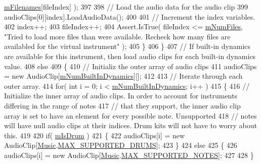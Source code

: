 \begin{DoxyCode}
      \hyperlink{group___v_i_base_pro_var_gab2add474ca506357688b5dd08cac4cb5}{mFilenames}[fileIndex] );
397 
398                 \textcolor{comment}{// Load the audio data for the audio clip}
399                 audioClips[0][index].LoadAudioData();
400 
401                 \textcolor{comment}{// Increment the index variables.}
402                 index++;
403                 fileIndex++;
404                 Assert.IsTrue( fileIndex <= \hyperlink{group___v_i_base_pro_var_ga9a602db8c9833ce75d95dd453c27d341}{mNumFiles}, \textcolor{stringliteral}{"Tried to load more files than were
       available. Recheck how many files are availabled for the virtual instrument"} );
405             \}
406         \}
407         \textcolor{comment}{// If built-in dynamics are available for this instrument, then load audio clips for each built-in
       dynamics value.}
408         \textcolor{keywordflow}{else}
409         \{
410             \textcolor{comment}{// Initializ the outer array of audio clips}
411             audioClips = \textcolor{keyword}{new} AudioClip[\hyperlink{group___v_i_base_pro_var_gac265f64f759d267ee1e1680f8d387011}{mNumBuiltInDynamics}][];
412 
413             \textcolor{comment}{// Iterate through each outer array.}
414             \textcolor{keywordflow}{for}( \textcolor{keywordtype}{int} i = 0; i < \hyperlink{group___v_i_base_pro_var_gac265f64f759d267ee1e1680f8d387011}{mNumBuiltInDynamics}; i++ )
415             \{
416                 \textcolor{comment}{// Initialize the inner array of audio clips. In order to account for instruments differing
       in the range of notes }
417                 \textcolor{comment}{// that they support, the inner audio clip array is set to have an element for every
       possible note. Unsupported}
418                 \textcolor{comment}{// notes will have null audio clips at their indices. Drum kits will not have to worry
       about this.}
419 
420                 \textcolor{keywordflow}{if}( \hyperlink{group___v_i_base_pro_var_ga47dbd8aa02ab32b8f802adfd2d3d81de}{mIsDrum} )
421                 \{
422                     audioClips[i] = \textcolor{keyword}{new} AudioClip[\hyperlink{class_music}{Music}.\hyperlink{group___music_constants_gabce1a1ac5b9b6355af6bd7fb3868467a}{MAX\_SUPPORTED\_DRUMS}];
423                 \}
424                 \textcolor{keywordflow}{else}
425                 \{
426                     audioClips[i] = \textcolor{keyword}{new} AudioClip[\hyperlink{class_music}{Music}.\hyperlink{group___music_constants_gaaf07da909a12e9fec0e43b70864f27b7}{MAX\_SUPPORTED\_NOTES}];
427 
428                 \}

\end{DoxyCode}
